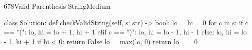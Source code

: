 \begin{problem}{678}{Valid Parenthesis String}{Medium}
\begin{code}
class Solution:
    def checkValidString(self, s: str) -> bool:
        lo = hi = 0
        for c in s:
            if c == "(":
                lo, hi = lo + 1, hi + 1
            elif c == ")":
                lo, hi = lo - 1, hi - 1
            else:
                lo, hi = lo - 1, hi + 1
            if hi < 0:
                return False
            lo = max(lo, 0)
        return lo == 0
\end{code}
\end{problem}
